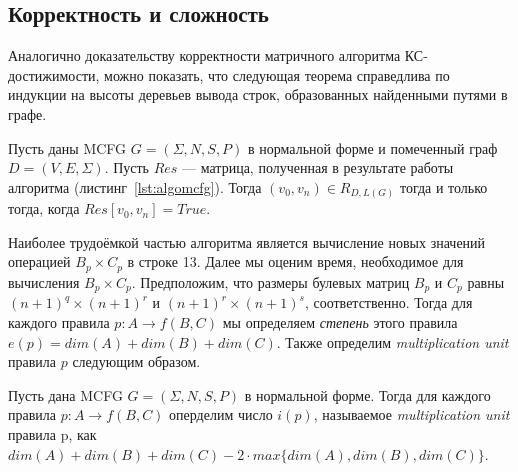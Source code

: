 
\subsection{Корректность и сложность}
Аналогично доказательству корректности матричного алгоритма КС-достижимости, можно показать, что следующая теорема справедлива по индукции на высоты деревьев вывода строк, образованных найденными путями в графе.

\begin{theorem}\label{thm:correctness}
	Пусть даны MCFG $G = (\Sigma, N, S, P)$ в нормальной форме и помеченный граф $D =(V, E, \Sigma)$. Пусть $Res$ --- матрица, полученная в результате работы алгоритма (листинг~\ref{lst:algomcfg}). Тогда $(v_0, v_n) \in R_{D,L(G)}$ тогда и только тогда, когда $Res[v_0,v_n] = True$.
\end{theorem}

Наиболее трудоёмкой частью алгоритма является вычисление новых значений операцией $B_p \times C_p$ в строке 13. Далее мы оценим время, необходимое для вычисления $B_p \times C_p$. Предположим, что размеры булевых матриц $B_p$ и $C_p$ равны $(n+1)^q \times (n+1)^r$ и $(n+1)^r \times (n+1)^s$, соответственно. Тогда для каждого правила $p: A \rightarrow f(B,C)$ мы определяем \textit{степень} этого правила $e(p) = dim(A) + dim(B) + dim(C)$. Также определим \textit{multiplication unit} правила $p$ следующим образом.

\begin{definition}
	Пусть дана MCFG $G = (\Sigma, N, S, P)$ в нормальной форме. Тогда для каждого правила $p: A \rightarrow f(B,C)$ оперделим число $i(p)$, называемое \textit{multiplication unit} правила p, как $dim(A) + dim(B) + dim(C) - 2 \cdot max\{dim(A), dim(B), dim(C)\}$.
\end{definition}


